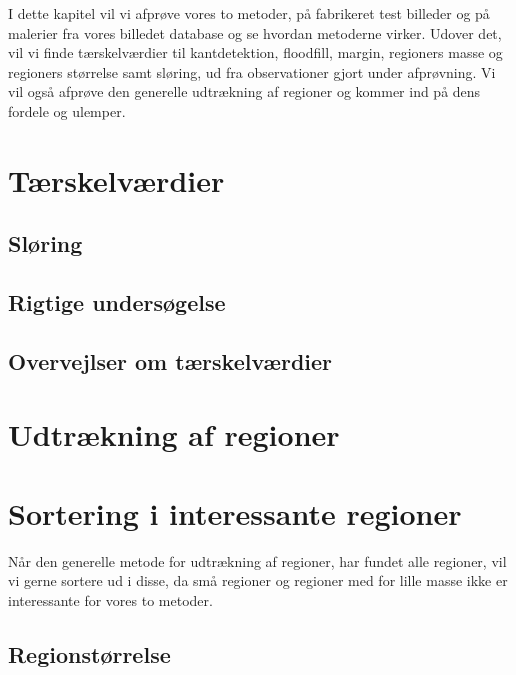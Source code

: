 {
{\sffamily
I dette kapitel vil vi afprøve vores to metoder, på fabrikeret test
billeder og på malerier fra vores billedet database og se hvordan
metoderne virker. Udover det, vil vi finde tærskelværdier til
kantdetektion, floodfill, margin, regioners masse og regioners størrelse
samt sløring, ud fra observationer gjort under afprøvning. Vi vil også
afprøve den generelle udtrækning af regioner og kommer ind på dens
fordele og ulemper.}

\section{Tærskelværdier\label{terskelverdi}}

\clearpage

\subsection{Sløring}

\clearpage

\subsection{Rigtige undersøgelse}


\subsection{Overvejlser om tærskelværdier}


\section{Udtrækning af regioner\label{region_detektor}}

\clearpage


\section{Sortering i interessante regioner}
{\sffamily Når den generelle metode for udtrækning af regioner, har
fundet alle regioner, vil vi gerne sortere ud i disse, da små
regioner og regioner med for lille masse ikke er interessante for vores
to metoder.
}

\subsection{Regionstørrelse \label{region_stoerlse}}

\clearpage

}

